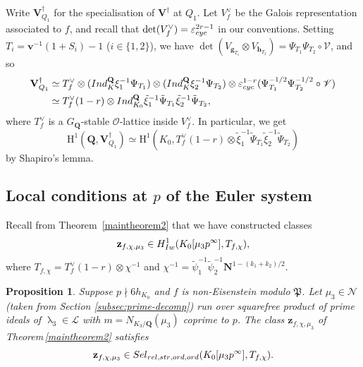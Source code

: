 \documentclass[10pt,letterpaper]{amsart}
\theoremstyle{plain}
\theoremstyle{definition}
\theoremstyle{definition}
\theoremstyle{plain}
\newtheorem{prop}[thm]{Proposition}
\theoremstyle{plain}
\theoremstyle{plain}
\theoremstyle{remark}
\numberwithin{equation}{section}
\newcommand{\ch}{\xi}
\newcommand{\rH}{{\mathrm{H}}}
\newcommand{\relstr}{{{\rm rel},{\rm str}}}
\newcommand{\ord}{{{\rm ord},{\rm ord}}}
\DeclareMathOperator{\la}{\lambda}
\def\cO{\mathcal O}
\newcommand{\Vsdag}{{\mathbf{V}_{Q_1}^\dagger}}
\newcommand{\Vdag}{{\mathbf{V}^\dagger}}
\newcommand{\Q}{\mathbf{Q}}
\newcommand{\bfg}{{\boldsymbol{g}}}
\newcommand{\bfh}{{\boldsymbol{h}}}
\begin{document}
Write $\Vsdag$ for the specialisation of $\Vdag$ at $Q_1$. Let $V_f^\vee$ be the Galois representation associated to $f$, and recall that $\det(V_f^\vee)=\varepsilon_{\rm cyc}^{2r-1}$ in our conventions. Setting $T_i=\mathbf{v}^{-1}(1+S_i)-1$ ($i\in\{1,2\}$), we have 
$\det(V_{\bfg_{T_1}}\otimes V_{\bfh_{T_2}})=\Psi_{T_1}\Psi_{T_2}\circ\mathscr{V}$, and so
\begin{equation}\label{eq:dec-V-first}
\begin{aligned}
\Vsdag&\simeq T_f^{\vee}\otimes({\rm Ind}_K^\Q\ch_1^{-1}\Psi_{T_1})\otimes({\rm Ind}_K^\Q\ch_2^{-1}\Psi_{T_2})\otimes\varepsilon_{\rm cyc}^{1-r}(\Psi_{T_1}^{-1/2}\Psi_{T_2}^{-1/2}\circ\mathscr{V})\\
&\simeq T_f^{\vee}(1-r)\otimes{\rm Ind}_{K_0}^\Q\tilde{\ch}_1^{-1}\tilde{\Psi}_{T_1}\tilde{\ch}_2^{-1}\tilde{\Psi}_{T_2},
\end{aligned}
\end{equation}
where $T_f^{\vee}$ is a $G_\Q$-stable $\cO$-lattice inside $V_f^{\vee}$. In particular, we get
\begin{equation}\label{eq:shapiro}
\rH^1(\Q,\Vsdag)\simeq\rH^1(K_0,T_f^{\vee}(1-r)\otimes\tilde{\ch}_1^{-1}\tilde{\Psi}_{T_1}\tilde{\ch}_2^{-1}\tilde{\Psi}_{T_2})
\end{equation}
by Shapiro's lemma.




\subsection{Local conditions at $p$ of the Euler system}\label{subsec:local-condition} 


Recall from Theorem~\ref{maintheorem2} that we have constructed classes
\[
\mathbf{z}_{f,\chi,\mu_3}\in H^1_{\rm Iw}(K_0[\mu_3p^\infty],T_{f,\chi}),
\]
where $T_{f,\chi}=T_f^{\vee}(1-r)\otimes\chi^{-1}$ and $\chi^{-1}=\tilde{\psi}_1^{-1}\tilde{\psi}_2^{-1}\mathbf{N}^{1-(k_1+k_2)/2}$.  

\begin{prop}
\label{propselmer2}
Suppose $p\nmid 6h_{K_0}$ and $f$ is non-Eisenstein modulo $\mathfrak{P}$. Let $\mu_3\in\mathcal{N}$ (taken from Section \ref{subsec:prime-decomp}) run over squarefree product of prime ideals of $\la_3\in\mathcal{L}$  with $m=N_{K_3/\Q}(\mu_3)$ coprime to $p$. The class $\mathbf{z}_{f,\chi,\mu_3}$ of Theorem\,\ref{maintheorem2} satisfies
\[
\mathbf{z}_{f,\chi,\mu_3}\in{\rm Sel}_{\relstr,\ord}(K_0[\mu_3p^\infty],T_{f,\chi}).
\]
\end{prop}
\end{document}
